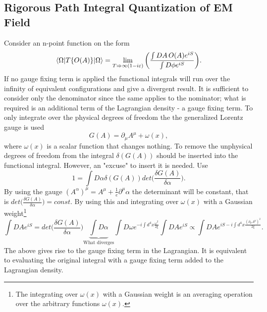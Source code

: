 \subsection*{Rigorous Path Integral Quantization of EM Field}
Consider an n-point function on the form
\begin{equation}
	\braket{\Omega|T\{O(A)\}|\Omega}=\lim\limits_{T\Rightarrow \infty(1-i\varepsilon)}\bigg(\frac{\int DA\,O(A) e^{iS}}{\int D\phi e^{iS}}\bigg).
	\label{valverde-show}
\end{equation} 
If no gauge fixing term is applied the functional integrals will run over the infinity of equivalent configurations and give a divergent result. It is sufficient to consider only the denominator since the same applies to the nominator; what is required is an additional term of the Lagrangian density - a gauge fixing term. To only integrate over the physical degrees of freedom the the generalized Lorentz gauge is used
\begin{equation}
	G(A)=\partial_\mu A^\mu+\omega(x),
\end{equation} 
where $\omega(x)$ is a scalar function that changes nothing. To remove the unphysical degrees of freedom from the integral $\delta (G(A))$ should be inserted into the functional integral. However, an "excuse" to insert it is needed. Use
\begin{equation}
	1=\int D\alpha \delta(G(A))det\bigg(\frac{\delta G(A)}{\delta \alpha}\bigg).
\end{equation} 
By using the gauge $(A^\alpha)^\mu=A^\mu+\frac{1}{e}\partial^\mu\alpha$ the determinant will be constant, that is $det\big(\frac{\delta G(A)}{\delta \alpha}\big)=const$. By using this and integrating over $\omega(x)$ with a Gaussian weight\footnote{The integrating over $\omega(x)$ with a Gaussian weight is an averaging operation over the arbitrary functions $\omega(x)$.}
\begin{equation}
	\int DA e^{iS}=det\bigg(\frac{\delta G(A)}{\delta \alpha}\bigg) \underbrace{\int D\alpha}_{\text{What diverges}} \int D\omega e^{-i\int d^4x \frac{\omega^2}{2\xi}}\int DA e^{iS}\propto \int DAe^{iS-i\int d^4x \frac{(\partial_\mu A^\mu)^2}{2\xi}}.
\end{equation} 
The above gives rise to the gauge fixing term in the Lagrangian. It is equivalent to evaluating the original integral with a gauge fixing term added to the Lagrangian density.

